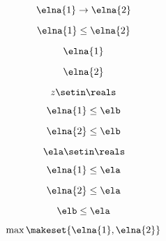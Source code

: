 \begin{forslides}
    \begin{equation}
        \label{eq:combination-132}
        \elna{1}\to \elna{2}
    \end{equation}

    \begin{equation}
        \label{eq:combination-133}
        \elna{1}\leq \elna{2}
    \end{equation}

    \begin{equation}
        \label{eq:combination-134}
        \elna{1}
    \end{equation}

    \begin{equation}
        \label{eq:combination-135}
        \elna{2}
    \end{equation}

    \begin{equation}
        \label{eq:combination-136}
        z\setin \reals
    \end{equation}

    \begin{equation}
        \label{eq:combination-137}
        \elna{1}\leq \elb
    \end{equation}

    \begin{equation}
        \label{eq:combination-138}
        \elna{2}\leq \elb
    \end{equation}

    \begin{equation}
        \label{eq:combination-139}
        \ela\setin \reals
    \end{equation}

    \begin{equation}
        \label{eq:combination-140}
        \elna{1}\leq \ela
    \end{equation}

    \begin{equation}
        \label{eq:combination-141}
        \elna{2}\leq \ela
    \end{equation}

    \begin{equation}
        \label{eq:combination-142}
        \elb\leq \ela
    \end{equation}

    \begin{equation}
        \label{eq:combination-143}
        \max\makeset{\elna{1},\elna{2}}
    \end{equation}


\end{forslides}
